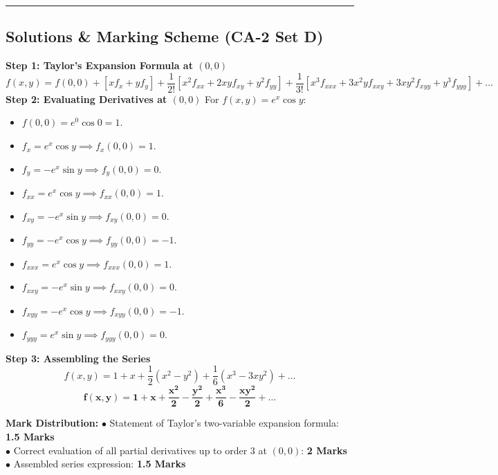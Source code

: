 \vspace{5mm}
\hrule
\vspace{5mm}

\subsection*{Solutions \& Marking Scheme (CA-2 Set D)}

\begin{solutionbox}
\textbf{Step 1: Taylor's Expansion Formula at $(0,0)$}
\[
f(x,y) = f(0,0) + [x f_x + y f_y] + \frac{1}{2!}[x^2 f_{xx} + 2xy f_{xy} + y^2 f_{yy}] + \frac{1}{3!}[x^3 f_{xxx} + 3x^2 y f_{xxy} + 3x y^2 f_{xyy} + y^3 f_{yyy}] + \dots
\]
\textbf{Step 2: Evaluating Derivatives at $(0,0)$}
For $f(x,y) = e^x \cos y$:
\begin{itemize}[leftmargin=6mm]
    \item $f(0,0) = e^0 \cos 0 = 1$.
    \item $f_x = e^x \cos y \implies f_x(0,0) = 1$.
    \item $f_y = -e^x \sin y \implies f_y(0,0) = 0$.
    \item $f_{xx} = e^x \cos y \implies f_{xx}(0,0) = 1$.
    \item $f_{xy} = -e^x \sin y \implies f_{xy}(0,0) = 0$.
    \item $f_{yy} = -e^x \cos y \implies f_{yy}(0,0) = -1$.
    \item $f_{xxx} = e^x \cos y \implies f_{xxx}(0,0) = 1$.
    \item $f_{xxy} = -e^x \sin y \implies f_{xxy}(0,0) = 0$.
    \item $f_{xyy} = -e^x \cos y \implies f_{xyy}(0,0) = -1$.
    \item $f_{yyy} = e^x \sin y \implies f_{yyy}(0,0) = 0$.
\end{itemize}
\textbf{Step 3: Assembling the Series}
\[
f(x,y) = 1 + x + \frac{1}{2}(x^2 - y^2) + \frac{1}{6}(x^3 - 3x y^2) + \dots
\]
\[
\mathbf{f(x,y) = 1 + x + \frac{x^2}{2} - \frac{y^2}{2} + \frac{x^3}{6} - \frac{x y^2}{2} + \dots}
\]

\begin{markingrubric}
\textbf{Mark Distribution:}
$\bullet$ Statement of Taylor's two-variable expansion formula: \textbf{1.5 Marks}\\
$\bullet$ Correct evaluation of all partial derivatives up to order 3 at $(0,0)$: \textbf{2 Marks}\\
$\bullet$ Assembled series expression: \textbf{1.5 Marks}
\end{markingrubric}
\end{solutionbox}

